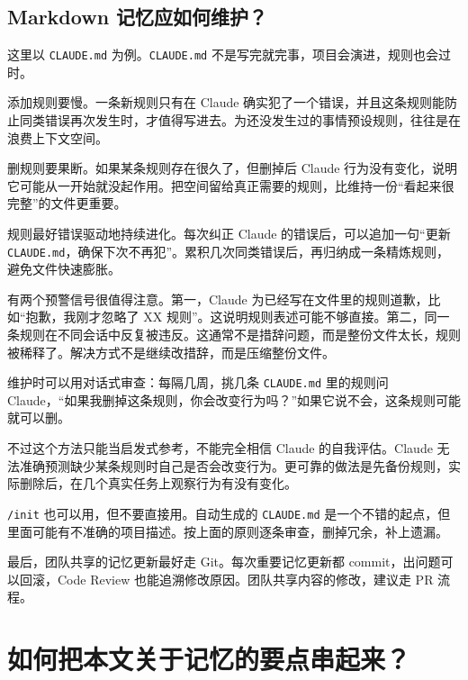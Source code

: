 \documentclass[10pt,a4paper]{ctexart}
\begin{document}
\subsection{Markdown 记忆应如何维护？}


这里以 \texttt{CLAUDE.md} 为例。\texttt{CLAUDE.md} 不是写完就完事，项目会演进，规则也会过时。



添加规则要慢。一条新规则只有在 Claude 确实犯了一个错误，并且这条规则能防止同类错误再次发生时，才值得写进去。为还没发生过的事情预设规则，往往是在浪费上下文空间。



删规则要果断。如果某条规则存在很久了，但删掉后 Claude 行为没有变化，说明它可能从一开始就没起作用。把空间留给真正需要的规则，比维持一份“看起来很完整”的文件更重要。



规则最好错误驱动地持续进化。每次纠正 Claude 的错误后，可以追加一句“更新 \texttt{CLAUDE.md}，确保下次不再犯”。累积几次同类错误后，再归纳成一条精炼规则，避免文件快速膨胀。



有两个预警信号很值得注意。第一，Claude 为已经写在文件里的规则道歉，比如“抱歉，我刚才忽略了 XX 规则”。这说明规则表述可能不够直接。第二，同一条规则在不同会话中反复被违反。这通常不是措辞问题，而是整份文件太长，规则被稀释了。解决方式不是继续改措辞，而是压缩整份文件。



维护时可以用对话式审查：每隔几周，挑几条 \texttt{CLAUDE.md} 里的规则问 Claude，“如果我删掉这条规则，你会改变行为吗？”如果它说不会，这条规则可能就可以删。



不过这个方法只能当启发式参考，不能完全相信 Claude 的自我评估。Claude 无法准确预测缺少某条规则时自己是否会改变行为。更可靠的做法是先备份规则，实际删除后，在几个真实任务上观察行为有没有变化。



\texttt{/init} 也可以用，但不要直接用。自动生成的 \texttt{CLAUDE.md} 是一个不错的起点，但里面可能有不准确的项目描述。按上面的原则逐条审查，删掉冗余，补上遗漏。



最后，团队共享的记忆更新最好走 Git。每次重要记忆更新都 commit，出问题可以回滚，Code Review 也能追溯修改原因。团队共享内容的修改，建议走 PR 流程。



\section{如何把本文关于记忆的要点串起来？}
\end{document}
